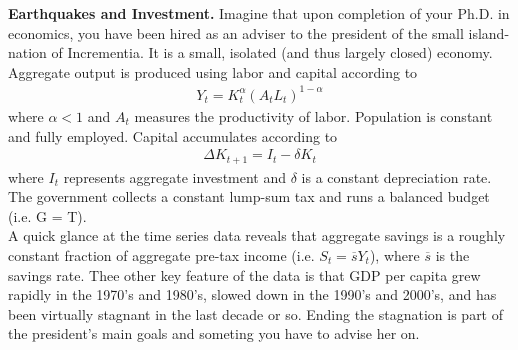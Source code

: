 \documentclass[11pt]{SelfArxOneColBMN}
\begin{document}
\textbf{Earthquakes and Investment.} Imagine that upon completion of your Ph.D. in economics, you have been hired as an adviser to the president of the small island-nation of Incrementia. It is a small, isolated (and thus largely closed) economy. Aggregate output is produced using labor and capital according to
\begin{eqnarray*}
  Y_t = K_t^\alpha(A_tL_t)^{1-\alpha}
\end{eqnarray*}
where $\alpha < 1$ and $A_t$ measures the productivity of labor. Population is constant and fully employed. Capital accumulates according to
\begin{eqnarray*}
  \Delta K_{t+1} = I_t - \delta K_t
\end{eqnarray*}
where $I_t$ represents aggregate investment and $\delta$ is a constant depreciation rate. The government collects a constant lump-sum tax and runs a balanced budget (i.e. G = T).\\
A quick glance at the time series data reveals that aggregate savings is a roughly constant fraction of aggregate pre-tax income (i.e. $S_t = \overline{s}Y_t$), where $\overline{s}$ is the savings rate. Thee other key feature of the data is that GDP per capita grew rapidly in the 1970's and 1980's, slowed down in the 1990's and 2000's, and has been virtually stagnant in the last decade or so. Ending the stagnation is part of the president's main goals and someting you have to advise her on.
\end{document}

